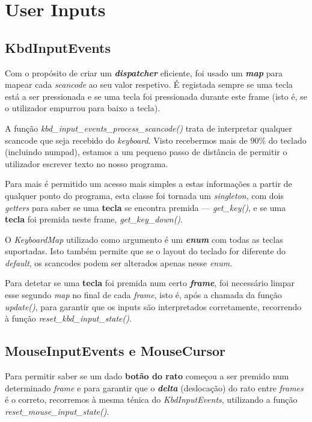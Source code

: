 \documentclass{report}
\begin{document}
\section{User Inputs}

\subsection{KbdInputEvents}

Com o propósito de criar um \textbf{\textit{dispatcher}} eficiente, foi usado um \textbf{\textit{map}} para mapear cada \textit{scancode} ao seu valor respetivo. É registada sempre se uma tecla está a ser pressionada e se uma tecla foi pressionada durante este frame (isto é, se o utilizador empurrou para baixo a tecla).

A função \textit{kbd\_input\_events\_process\_scancode()} trata de interpretar qualquer scancode que seja recebido do \textit{keyboard}. Visto recebermos mais de 90\% do teclado (incluindo numpad), estamos a um pequeno passo de distância de permitir o utilizador escrever texto no nosso programa.

Para mais é permitido um acesso mais simples a estas informações a partir de qualquer ponto do programa, esta classe foi tornada um \textit{singleton}, com dois \textit{getters} para saber se uma \textbf{tecla} se encontra premida --- \textit{get\_key()}, e se uma \textbf{tecla} foi premida neste frame, \textit{get\_key\_down()}.

O \textit{KeyboardMap} utilizado como argumento é um \textbf{\textit{enum}} com todas as teclas suportadas. Isto também permite que se o layout do teclado for diferente do \textit{default}, os scancodes podem ser alterados apenas nesse \textit{enum}.

Para detetar se uma \textbf{tecla} foi premida num certo \textbf{\textit{frame}}, foi necessário limpar esse segundo \textit{map} no final de cada \textit{frame}, isto é, após a chamada da função \textit{update()}, para garantir que os inputs são interpretados corretamente, recorrendo à função \textit{reset\_kbd\_input\_state()}.

\subsection{MouseInputEvents e MouseCursor}

Para permitir saber se um dado \textbf{botão do rato} começou a ser premido num determinado \textit{frame} e para garantir que o \textbf{\textit{delta}} (deslocação) do rato entre \textit{frames} é o correto, recorremos à mesma ténica do \textit{KbdInputEvents}, utilizando a função \textit{reset\_mouse\_input\_state()}.
\end{document}
